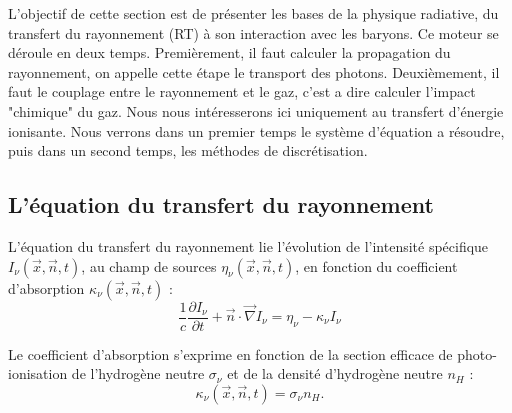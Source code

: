 L'objectif de cette section est de présenter les bases de la physique radiative, du transfert du rayonnement (RT) à son interaction avec les baryons.
Ce moteur se déroule en deux temps.
Premièrement, il faut calculer la propagation du rayonnement, on appelle cette étape le transport des photons.
Deuxièmement, il faut le couplage entre le rayonnement et le gaz, c'est a dire calculer l'impact "chimique" du gaz.
Nous nous intéresserons ici uniquement au transfert d'énergie ionisante.
Nous verrons dans un premier temps le système d'équation a résoudre, puis dans un second temps, les méthodes de discrétisation.

\subsection{L'équation du transfert du rayonnement}

L'équation du transfert du rayonnement lie l'évolution de l'intensité spécifique $I_\nu(\vec{x},\vec{n},t)$, au champ de sources $\eta_\nu(\vec{x},\vec{n},t)$, en fonction du coefficient d'absorption $\kappa_\nu(\vec{x},\vec{n},t)$ :
\begin{equation}
\frac{1}{c} \frac{\partial I_\nu}{\partial t} + \vec{n}\cdot \vec{\nabla} I_\nu = \eta_\nu - \kappa_\nu I_\nu 
\label{eq:rad}
\end{equation}

Le coefficient d'absorption s'exprime en fonction de la section efficace de photo-ionisation de l'hydrogène neutre $\sigma_\nu$ et de la densité d'hydrogène neutre $n_H$ :
\begin{equation}
\kappa_\nu(\vec{x},\vec{n},t) = \sigma_\nu n_H.
\end{equation}

